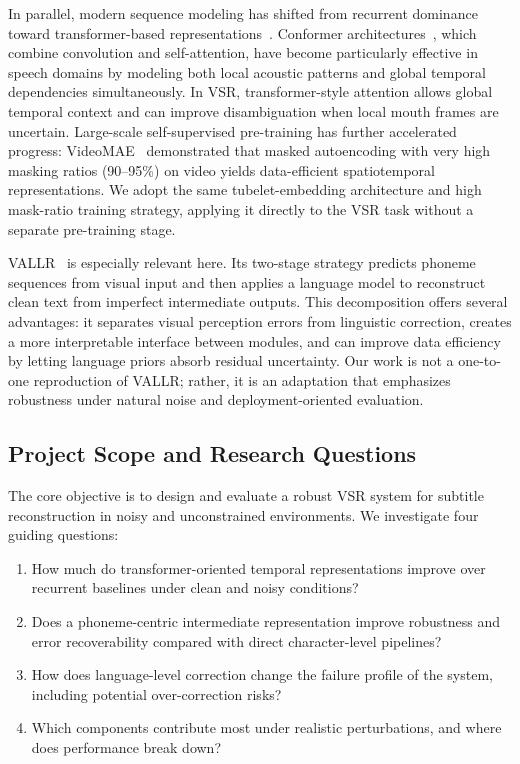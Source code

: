 \documentclass[10pt,twocolumn,letterpaper]{article}
\begin{document}
In parallel, modern sequence modeling has shifted from recurrent dominance toward transformer-based representations~\cite{vaswani2017attention,dosovitskiy2021vit}. Conformer architectures~\cite{conformer2020}, which combine convolution and self-attention, have become particularly effective in speech domains by modeling both local acoustic patterns and global temporal dependencies simultaneously. In VSR, transformer-style attention allows global temporal context and can improve disambiguation when local mouth frames are uncertain. Large-scale self-supervised pre-training has further accelerated progress: VideoMAE~\cite{tong2022videomae} demonstrated that masked autoencoding with very high masking ratios (90--95\%) on video yields data-efficient spatiotemporal representations. We adopt the same tubelet-embedding architecture and high mask-ratio training strategy, applying it directly to the VSR task without a separate pre-training stage.

VALLR~\cite{thomas2025vallr} is especially relevant here. Its two-stage strategy predicts phoneme sequences from visual input and then applies a language model to reconstruct clean text from imperfect intermediate outputs. This decomposition offers several advantages: it separates visual perception errors from linguistic correction, creates a more interpretable interface between modules, and can improve data efficiency by letting language priors absorb residual uncertainty. Our work is not a one-to-one reproduction of VALLR; rather, it is an adaptation that emphasizes robustness under natural noise and deployment-oriented evaluation.

\subsection{Project Scope and Research Questions}
The core objective is to design and evaluate a robust VSR system for subtitle reconstruction in noisy and unconstrained environments. We investigate four guiding questions:
\begin{enumerate}[leftmargin=*]
    \item How much do transformer-oriented temporal representations improve over recurrent baselines under clean and noisy conditions?
    \item Does a phoneme-centric intermediate representation improve robustness and error recoverability compared with direct character-level pipelines?
    \item How does language-level correction change the failure profile of the system, including potential over-correction risks?
    \item Which components contribute most under realistic perturbations, and where does performance break down?
\end{enumerate}
\end{document}
